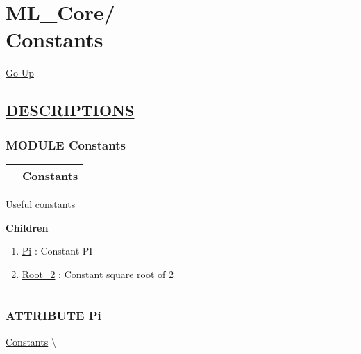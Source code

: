 \chapter*{\color{headfile}
{\large ML\_Core\slash\hspace{0pt}}
 \\
Constants
}
\hypertarget{ecldoc:toc:ML_Core.Constants}{}
\hyperlink{ecldoc:toc:root/ML_Core}{Go Up}


\section*{\underline{\textsf{DESCRIPTIONS}}}
\subsection*{\textsf{\colorbox{headtoc}{\color{white} MODULE}
Constants}}

\hypertarget{ecldoc:ML_Core.Constants}{}

{\renewcommand{\arraystretch}{1.5}
\begin{tabularx}{\textwidth}{|>{\raggedright\arraybackslash}l|X|}
\hline
\hspace{0pt}\mytexttt{\color{red} } & \textbf{Constants} \\
\hline
\end{tabularx}
}

\par





Useful constants







\textbf{Children}
\begin{enumerate}
\item \hyperlink{ecldoc:ml_core.constants.pi}{Pi}
: Constant PI
\item \hyperlink{ecldoc:ml_core.constants.root_2}{Root\_2}
: Constant square root of 2
\end{enumerate}

\rule{\linewidth}{0.5pt}

\subsection*{\textsf{\colorbox{headtoc}{\color{white} ATTRIBUTE}
Pi}}

\hypertarget{ecldoc:ml_core.constants.pi}{}
\hspace{0pt} \hyperlink{ecldoc:ML_Core.Constants}{Constants} \textbackslash 

